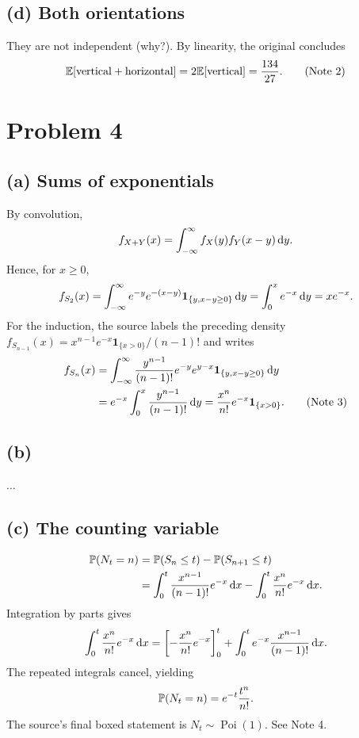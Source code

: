 \documentclass[11pt,a4paper]{article}
\begin{document}
\subsection*{(d) Both orientations}
They are not independent (why?). By linearity, the original concludes
\[
\E[\text{vertical}+\text{horizontal}]
=2\E[\text{vertical}]=\frac{134}{27}.\tag{Note 2}
\]

\section*{Problem 4}
\subsection*{(a) Sums of exponentials}
By convolution,
\[
f_{X+Y}(x)=\int_{-\infty}^\infty f_X(y)f_Y(x-y)\d y.
\]
Hence, for $x\ge0$,
\[
f_{S_2}(x)=\int_{-\infty}^\infty e^{-y}e^{-(x-y)}
\mathbf1_{\{y,x-y\ge0\}}\d y
=\int_0^xe^{-x}\d y=xe^{-x}.
\]
For the induction, the source labels the preceding density
$f_{S_{n-1}}(x)=x^{n-1}e^{-x}\mathbf1_{\{x>0\}}/(n-1)!$
and writes
\begin{align*}
f_{S_n}(x)&=\int_{-\infty}^\infty\frac{y^{n-1}}{(n-1)!}
e^{-y}e^{y-x}\mathbf1_{\{y,x-y\ge0\}}\d y\\
&=e^{-x}\int_0^x\frac{y^{n-1}}{(n-1)!}\d y
=\frac{x^n}{n!}e^{-x}\mathbf1_{\{x>0\}}.\tag{Note 3}
\end{align*}
\subsection*{(b)} $\ldots$
\subsection*{(c) The counting variable}
\begin{align*}
\P(N_t=n)&=\P(S_n\le t)-\P(S_{n+1}\le t)\\
&=\int_0^t\frac{x^{n-1}}{(n-1)!}e^{-x}\d x
-\int_0^t\frac{x^n}{n!}e^{-x}\d x.
\end{align*}
Integration by parts gives
\[
\int_0^t\frac{x^n}{n!}e^{-x}\d x
=\left[-\frac{x^n}{n!}e^{-x}\right]_0^t
+\int_0^te^{-x}\frac{x^{n-1}}{(n-1)!}\d x.
\]
The repeated integrals cancel, yielding
\[
\P(N_t=n)=e^{-t}\frac{t^n}{n!}.
\]
The source's final boxed statement is $N_t\sim\operatorname{Poi}(1)$. See Note 4.
\end{document}
